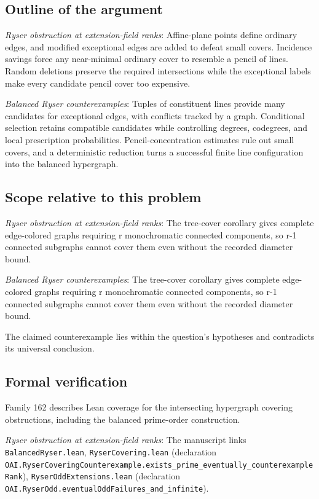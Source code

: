 \documentclass[11pt]{article}
\begin{document}
\subsection{Outline of the argument}
\textit{Ryser obstruction at extension-field ranks}: Affine-plane points define ordinary edges, and modified exceptional edges are added to defeat small covers. Incidence savings force any near-minimal ordinary cover to resemble a pencil of lines. Random deletions preserve the required intersections while the exceptional labels make every candidate pencil cover too expensive.

\textit{Balanced Ryser counterexamples}: Tuples of constituent lines provide many candidates for exceptional edges, with conflicts tracked by a graph. Conditional selection retains compatible candidates while controlling degrees, codegrees, and local prescription probabilities. Pencil-concentration estimates rule out small covers, and a deterministic reduction turns a successful finite line configuration into the balanced hypergraph.

\subsection{Scope relative to this problem}
\textit{Ryser obstruction at extension-field ranks}: The tree-cover corollary gives complete edge-colored graphs requiring r monochromatic connected components, so r-1 connected subgraphs cannot cover them even without the recorded diameter bound.

\textit{Balanced Ryser counterexamples}: The tree-cover corollary gives complete edge-colored graphs requiring r monochromatic connected components, so r-1 connected subgraphs cannot cover them even without the recorded diameter bound.

The claimed counterexample lies within the question’s hypotheses and contradicts its universal conclusion.

\subsection{Formal verification}
Family 162 describes Lean coverage for the intersecting hypergraph covering obstructions, including the balanced prime-order construction.

\textit{Ryser obstruction at extension-field ranks}: The manuscript links \texttt{BalancedRyser.lean}, \texttt{RyserCovering.lean} (declaration \texttt{OAI.RyserCoveringCounterexample.exists\_prime\_eventually\_counterexampleRank}), \texttt{RyserOddExtensions.lean} (declaration \texttt{OAI.RyserOdd.eventualOddFailures\_and\_infinite}).
\end{document}
